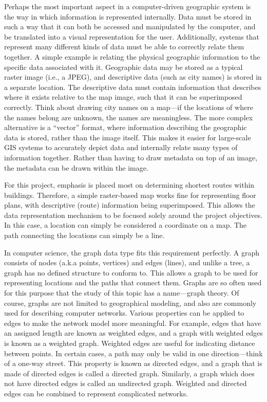 \documentclass[12pt,letterpaper,titlepage]{article}   %
\begin{document}
Perhaps the most important aspect in a computer-driven geographic system
is the way in which information is represented internally. Data must be
stored in such a way that it can both be accessed and manipulated by the
computer, and be translated into a visual representation for the user.
Additionally, systems that represent many different kinds of data must
be able to correctly relate them together. A simple example is relating
the physical geographic information to the specific data associated with
it. Geographic data may be stored as a typical raster image (i.e., a
JPEG), and descriptive data (such as city names) is stored in a separate
location. The descriptive data must contain information that describes
where it exists relative to the map image, such that it can be
superimposed correctly. Think about drawing city names on a map---if the
locations of where the names belong are unknown, the names are
meaningless. The more complex alternative is a ``vector'' format, where
information describing the geographic data is stored, rather than the
image itself. This makes it easier for large-scale GIS systems to
accurately depict data and internally relate many types of information
together. Rather than having to draw metadata on top of an image, the
metadata can be drawn within the image. \cite{wiki:gis}

For this project, emphasis is placed most on determining shortest routes
within buildings. Therefore, a simple raster-based map works fine for
representing floor plans, with descriptive (route) information being
superimposed. This allows the data representation mechanism to be
focused solely around the project objectives. In this case, a location
can simply be considered a coordinate on a map. The path connecting the
locations can simply be a line.

In computer science, the graph data type fits this requirement
perfectly. A graph consists of nodes (a.k.a points, vertices) and edges
(lines), and unlike a tree, a graph has no defined structure to conform
to. This allows a graph to be used for representing locations and the
paths that connect them. Graphs are so often used for this purpose that
the study of this topic has a name---graph theory. Of course, graphs are
not limited to geographical modeling, and also are commonly used for
describing computer networks. Various properties can be applied to edges
to make the network model more meaningful. For example, edges that have
an assigned length are known as weighted edges, and a graph with
weighted edges is
known as a weighted graph. Weighted edges are useful
for indicating distance between points. In certain cases, a path may
only be valid in one direction---think of a one-way street. This
property is known as directed edges, and a graph that is made of
directed edges is called a directed graph. Similarly, a graph which does
not have directed edges is called an undirected graph. Weighted and
directed edges can be combined to represent complicated networks.
\cite{wiki:gt}
\end{document}
